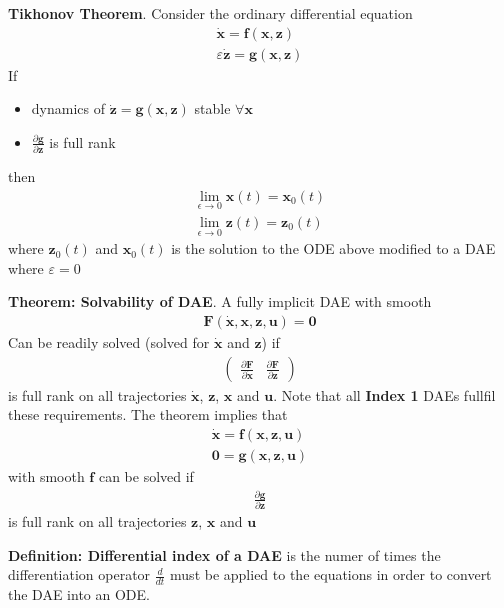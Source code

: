 \textbf{Tikhonov Theorem}. Consider the ordinary differential equation
\begin{align*}
    \dot{\bm{x}} = \bm{f}(\bm{x},\bm{z}) \\
    \varepsilon \dot{\bm{z}} = \bm{g}(\bm{x},\bm{z})
\end{align*}
If \begin{itemize}
    \item dynamics of \(\dot{\bm{z}} = \bm{g}(\bm{x},\bm{z})\) stable \(\forall \bm{x}\)
    \item \(\frac{\partial \bm{g}}{\partial \bm{z}}\) is full rank
\end{itemize}
then
\begin{align*}
    \lim_{\epsilon \rightarrow 0} \bm{x}(t) = \bm{x}_0(t) \\
    \lim_{\epsilon \rightarrow 0} \bm{z}(t) = \bm{z}_0(t)
\end{align*}
where \(\bm{z}_0(t)\) and \(\bm{x}_0(t)\) is the solution to the ODE above modified to a DAE where \(\varepsilon = 0\)
\newline

\textbf{Theorem: Solvability of DAE}. A fully implicit DAE with smooth
\begin{align*}
    \bm{F}(\dot{\bm{x}},\bm{x},\bm{z},\bm{u}) = \bm{0}
\end{align*}
Can be readily solved (solved for \(\dot{\bm{x}}\) and \(\bm{z}\)) if
\begin{align*}
    \begin{pmatrix}\frac{\partial \bm{F}}{\partial \dot{\bm{x}}} & \frac{\partial \bm{F}}{\partial \bm{z}} \end{pmatrix}
\end{align*}
is full rank on all trajectories \(\dot{\bm{x}}\), \(\bm{z}\), \(\bm{x}\) and \(\bm{u}\). Note that all \textbf{Index 1} DAEs fullfil these requirements. The theorem implies that
\begin{align*}
    \dot{\bm{x}} = \bm{f}(\bm{x},\bm{z},\bm{u}) \\
    \bm{0} = \bm{g}(\bm{x},\bm{z},\bm{u})
\end{align*}
with smooth \(\bm{f}\) can be solved if
\begin{align*}
    \frac{\partial \bm{g}}{\partial \bm{z}}
\end{align*}
is full rank on all trajectories \(\bm{z}\), \(\bm{x}\) and \(\bm{u}\)
\newline

\textbf{Definition: Differential index of a DAE} is the numer of times the differentiation operator \(\frac{d}{dt}\)
must be applied to the equations in order to convert the DAE into an ODE.
